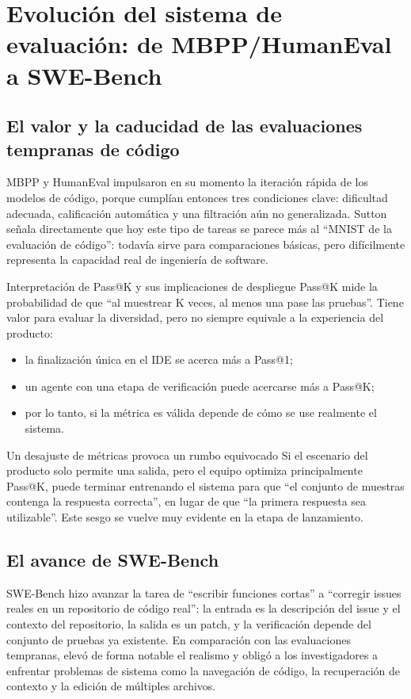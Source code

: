 \section{Evolución del sistema de evaluación: de MBPP/HumanEval a SWE-Bench}

\subsection{El valor y la caducidad de las evaluaciones tempranas de código}
MBPP y HumanEval impulsaron en su momento la iteración rápida de los modelos de código, porque cumplían entonces tres condiciones clave: dificultad adecuada, calificación automática y una filtración aún no generalizada. Sutton señala directamente que hoy este tipo de tareas se parece más al ``MNIST de la evaluación de código'': todavía sirve para comparaciones básicas, pero difícilmente representa la capacidad real de ingeniería de software.

\begin{knowledgebox}{Interpretación de Pass@K y sus implicaciones de despliegue}
Pass@K mide la probabilidad de que ``al muestrear K veces, al menos una pase las pruebas''. Tiene valor para evaluar la diversidad, pero no siempre equivale a la experiencia del producto:
\begin{itemize}
    \item la finalización única en el IDE se acerca más a Pass@1;
    \item un agente con una etapa de verificación puede acercarse más a Pass@K;
    \item por lo tanto, si la métrica es válida depende de cómo se use realmente el sistema.
\end{itemize}
\end{knowledgebox}

\begin{warningbox}{Un desajuste de métricas provoca un rumbo equivocado}
Si el escenario del producto solo permite una salida, pero el equipo optimiza principalmente Pass@K, puede terminar entrenando el sistema para que ``el conjunto de muestras contenga la respuesta correcta'', en lugar de que ``la primera respuesta sea utilizable''. Este sesgo se vuelve muy evidente en la etapa de lanzamiento.
\end{warningbox}

\subsection{El avance de SWE-Bench}
SWE-Bench hizo avanzar la tarea de ``escribir funciones cortas'' a ``corregir issues reales en un repositorio de código real'': la entrada es la descripción del issue y el contexto del repositorio, la salida es un patch, y la verificación depende del conjunto de pruebas ya existente. En comparación con las evaluaciones tempranas, elevó de forma notable el realismo y obligó a los investigadores a enfrentar problemas de sistema como la navegación de código, la recuperación de contexto y la edición de múltiples archivos.

